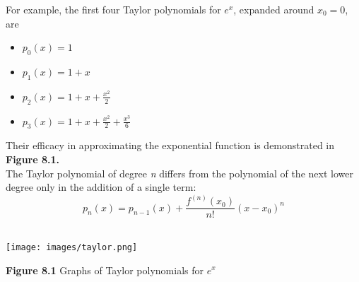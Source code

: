\documentclass{article}
\begin{document}
For example, the first four Taylor polynomials for \begin{math} e^x \end{math}, expanded around \begin{math} x_0 =0 \end{math}, are

\begin{itemize}
\item  \begin{math}
p_0(x) = 1
\end{math}

\item \begin{math}
p_1(x) = 1 + x
\end{math}

\item  \begin{math}
p_2(x) = 1 + x + \frac{x^2}{2}
\end{math}

\item  \begin{math}
p_3(x) = 1 + x + \frac{x^2}{2} + \frac{x^3}{6}
\end{math}
\end{itemize}


Their efficacy in approximating the exponential function is demonstrated in \textbf{Figure 8.1.}
\\

The Taylor polynomial of degree \textsl{n} differs from the polynomial of the next lower degree only in the addition of a single term:\\

\begin{equation}
    p_n(x) = p_{n-1}(x) + \frac{f^{(n)}(x_0)}{n!}(x-x_0)^n
\end{equation}\\

\begin{center}
    
\texttt{[image: images/taylor.png]}
\end{center}
\begin{center}
\textbf{Figure 8.1} Graphs of Taylor polynomials for \begin{math} e^x \end{math}
\end{center}\\
\end{document}
